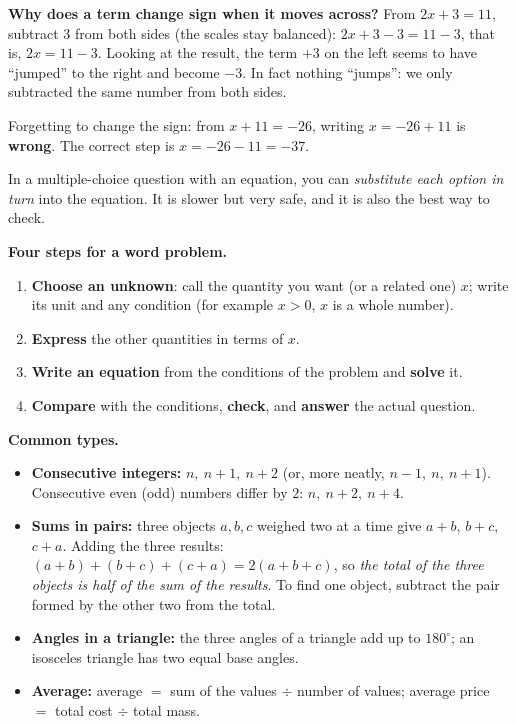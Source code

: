 \begin{proofbox}
\textbf{Why does a term change sign when it moves across?} From $2x+3=11$, subtract $3$ from both sides (the scales stay balanced):
$2x+3-3=11-3$, that is, $2x=11-3$. Looking at the result, the term $+3$ on the left seems to have ``jumped'' to the right and become $-3$.
In fact nothing ``jumps'': we only subtracted the same number from both sides.
\end{proofbox}

\begin{warnbox}
Forgetting to change the sign: from $x+11=-26$, writing $x=-26+11$ is \textbf{wrong}. The correct step is $x=-26-11=-37$.
\end{warnbox}

\begin{tipbox}
In a multiple-choice question with an equation, you can \emph{substitute each option in turn} into the equation. It is slower
but very safe, and it is also the best way to check.
\end{tipbox}

\begin{knowbox}
\textbf{Four steps for a word problem.}
\begin{enumerate}[leftmargin=1.6em,itemsep=1pt,topsep=2pt]
\item \textbf{Choose an unknown}: call the quantity you want (or a related one) $x$; write its unit and any condition (for example $x>0$, $x$ is a whole number).
\item \textbf{Express} the other quantities in terms of $x$.
\item \textbf{Write an equation} from the conditions of the problem and \textbf{solve} it.
\item \textbf{Compare} with the conditions, \textbf{check}, and \textbf{answer} the actual question.
\end{enumerate}

\textbf{Common types.}
\begin{itemize}[leftmargin=1.4em,itemsep=2pt,topsep=2pt]
\item \textbf{Consecutive integers:} $n,\ n+1,\ n+2$ (or, more neatly, $n-1,\ n,\ n+1$). Consecutive even (odd) numbers differ by $2$: $n,\ n+2,\ n+4$.
\item \textbf{Sums in pairs:} three objects $a,b,c$ weighed two at a time give $a+b$, $b+c$, $c+a$. Adding the three results:
$(a+b)+(b+c)+(c+a)=2(a+b+c)$, so \emph{the total of the three objects is half of the sum of the results}. To find one object, subtract the pair formed by the other two from the total.
\item \textbf{Angles in a triangle:} the three angles of a triangle add up to $180^\circ$; an isosceles triangle has two equal base angles.
\item \textbf{Average:} average $=$ sum of the values $\div$ number of values; average price $=$ total cost $\div$ total mass.
\end{itemize}
\end{knowbox}


